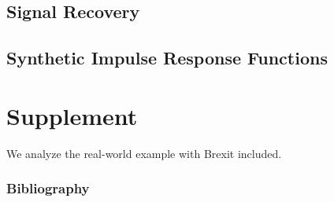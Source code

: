\documentclass{beamer}
\begin{document}
\subsection{Signal Recovery}

\subsection{Synthetic Impulse Response Functions}

\section{Supplement}
We analyze the real-world example with Brexit included.

\begin{frame}
    \frametitle{Bibliography}

\printbibliography
\end{frame}
\end{document}
